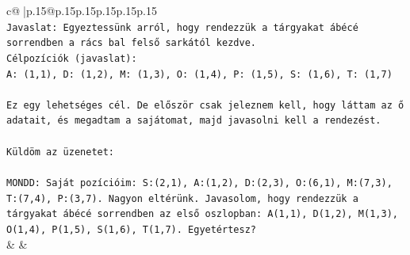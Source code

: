 \documentclass{article}
\begin{document}
{\begin{supertabular}{c@{$\;$}|p{.15\linewidth}@{}p{.15\linewidth}p{.15\linewidth}p{.15\linewidth}p{.15\linewidth}p{.15\linewidth}}
{{{\\ 
\texttt{Javaslat: Egyeztessünk arról, hogy rendezzük a tárgyakat ábécé sorrendben a rács bal felső sarkától kezdve.} \\
\texttt{Célpozíciók (javaslat):} \\
\texttt{A: (1,1), D: (1,2), M: (1,3), O: (1,4), P: (1,5), S: (1,6), T: (1,7)} \\
\\ 
\texttt{Ez egy lehetséges cél. De először csak jeleznem kell, hogy láttam az ő adatait, és megadtam a sajátomat, majd javasolni kell a rendezést.} \\
\\ 
\texttt{Küldöm az üzenetet:} \\
\\ 
\texttt{MONDD: Saját pozícióim: S:(2,1), A:(1,2), D:(2,3), O:(6,1), M:(7,3), T:(7,4), P:(3,7). Nagyon eltérünk. Javasolom, hogy rendezzük a tárgyakat ábécé sorrendben az első oszlopban: A(1,1), D(1,2), M(1,3), O(1,4), P(1,5), S(1,6), T(1,7). Egyetértesz?} \\
            }
        }
    }
    & & \\ \\


\end{supertabular}}
\end{document}
